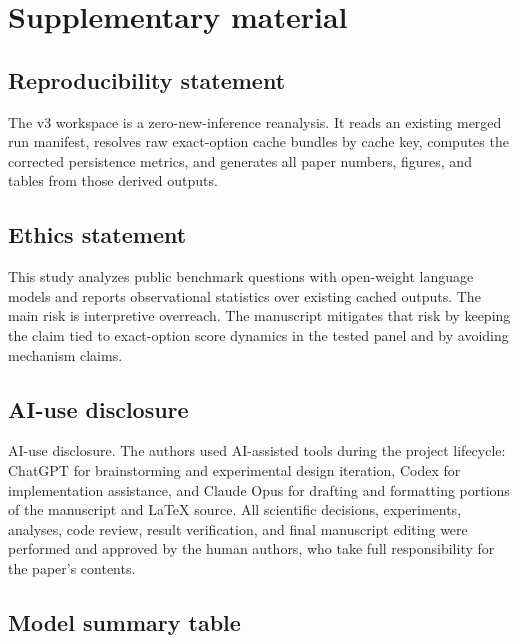 \section{Supplementary material}

\subsection{Reproducibility statement}

The v3 workspace is a zero-new-inference reanalysis. It reads an existing merged run manifest, resolves raw exact-option cache bundles by cache key, computes the corrected persistence metrics, and generates all paper numbers, figures, and tables from those derived outputs.

\subsection*{Ethics statement}

This study analyzes public benchmark questions with open-weight language models and reports observational statistics over existing cached outputs. The main risk is interpretive overreach. The manuscript mitigates that risk by keeping the claim tied to exact-option score dynamics in the tested panel and by avoiding mechanism claims.

\subsection*{AI-use disclosure}

AI-use disclosure. The authors used AI-assisted tools during the project lifecycle: ChatGPT for brainstorming and experimental design iteration, Codex for implementation assistance, and Claude Opus for drafting and formatting portions of the manuscript and LaTeX source. All scientific decisions, experiments, analyses, code review, result verification, and final manuscript editing were performed and approved by the human authors, who take full responsibility for the paper’s contents.

\subsection{Model summary table}

\begin{center}
\small

\end{center}

